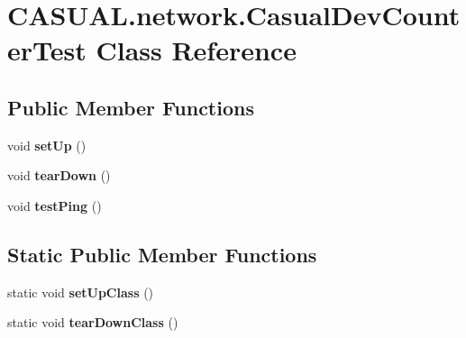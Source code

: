 \hypertarget{classCASUAL_1_1network_1_1CasualDevCounterTest}{\section{C\-A\-S\-U\-A\-L.\-network.\-Casual\-Dev\-Counter\-Test Class Reference}
\label{classCASUAL_1_1network_1_1CasualDevCounterTest}
}
\subsection*{Public Member Functions}
\begin{DoxyCompactItemize}
\item 
\hypertarget{classCASUAL_1_1network_1_1CasualDevCounterTest_a96ae63c9e5d0c4acf0e2a6611340941b}{void {\bfseries set\-Up} ()}\label{classCASUAL_1_1network_1_1CasualDevCounterTest_a96ae63c9e5d0c4acf0e2a6611340941b}

\item 
\hypertarget{classCASUAL_1_1network_1_1CasualDevCounterTest_ad7f374ee864abb6453b444a079024274}{void {\bfseries tear\-Down} ()}\label{classCASUAL_1_1network_1_1CasualDevCounterTest_ad7f374ee864abb6453b444a079024274}

\item 
\hypertarget{classCASUAL_1_1network_1_1CasualDevCounterTest_a1ba763b513cd1c770c9b1f372e8ffbc0}{void {\bfseries test\-Ping} ()}\label{classCASUAL_1_1network_1_1CasualDevCounterTest_a1ba763b513cd1c770c9b1f372e8ffbc0}

\end{DoxyCompactItemize}
\subsection*{Static Public Member Functions}
\begin{DoxyCompactItemize}
\item 
\hypertarget{classCASUAL_1_1network_1_1CasualDevCounterTest_a2dc221e20a7a86153ac9456b922ea2b4}{static void {\bfseries set\-Up\-Class} ()}\label{classCASUAL_1_1network_1_1CasualDevCounterTest_a2dc221e20a7a86153ac9456b922ea2b4}

\item 
\hypertarget{classCASUAL_1_1network_1_1CasualDevCounterTest_a5a6b41c9de4ca8dff3bd950783bbb2ca}{static void {\bfseries tear\-Down\-Class} ()}\label{classCASUAL_1_1network_1_1CasualDevCounterTest_a5a6b41c9de4ca8dff3bd950783bbb2ca}

\end{DoxyCompactItemize}


